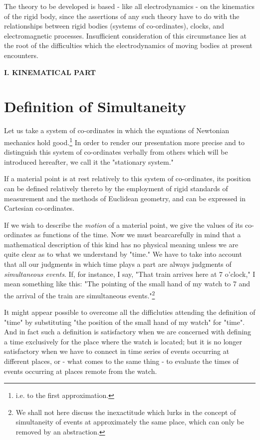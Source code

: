 The theory to be developed is based - like all electrodynamics - on the kinematics of the rigid body, since the assertions of any such theory have to do with the relationships between rigid bodies (systems of co-ordinates), clocks, and electromagnetic processes. Insufficient consideration of this circumstance lies at the root of the difficulties which the electrodynamics of moving bodies at present encounters.


\vspace{2em}
\begin{center}
    \Large\textbf{I. KINEMATICAL PART}
\end{center}

\section{Definition of Simultaneity}
Let us take a system of co-ordinates in which the equations of Newtonian mechanics hold good.\footnote{i.e. to the first approximation.} In order to render our presentation more precise and to distinguish this system of co-ordinates verbally from others which will be introduced hereafter, we call it the "stationary system."

If a material point is at rest relatively to this system of co-ordinates, its position can be defined relatively thereto by the employment of rigid standards of measurement and the methods of Euclidean geometry, and can be expressed in Cartesian co-ordinates.

If we wish to describe the \textit{motion} of a material point, we give the values of its co-ordinates as functions of the time. Now we must bearcarefully in mind that a mathematical description of this kind has no physical meaning unless we are quite clear as to what we understand by "time." We have to take into account that all our judgments in which time plays a part are always judgments of \textit{simultaneous events}. If, for instance, I say, "That train arrives here at 7 o'clock," I mean something like this: "The pointing of the small hand of my watch to 7 and the arrival of the train are simultaneous events."\footnote{We shall not here discuss the inexactitude which lurks in the concept of simultaneity of events at approximately the same place, which can only be removed by an abstraction.}

It might appear possible to overcome all the difficluties attending the definition of "time" by substituting "the position of the small hand of my watch" for "time". And in fact such a definition is satisfactory when we are concerned with defining a time exclusively for the place where the watch is located; but it is no longer satisfactory when we have to connect in time series of events occurring at different places, or - what comes to the same thing - to evaluate the times of events occurring at places remote from the watch.

